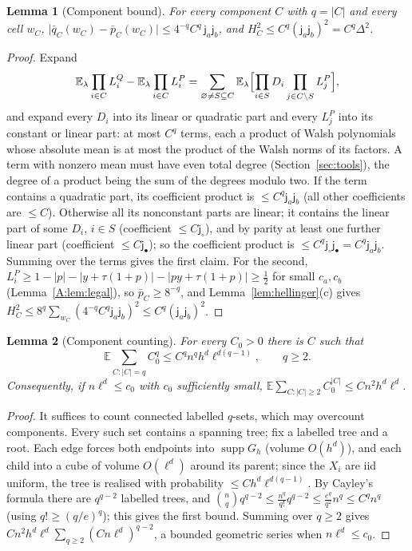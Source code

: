 \documentclass[11pt]{article}
\newtheorem{lemma}[lemma]{Lemma}
\DeclareMathOperator{\supp}{supp}
\newcommand{\E}{\mathbb{E}}
\newcommand{\abs}[1]{\lvert #1\rvert}
\newcommand{\ja}{\mathsf{j}_a}
\newcommand{\jb}{\mathsf{j}_b}
\newcommand{\jsh}{\mathsf{j}_\circ}
\newcommand{\jfi}{\mathsf{j}_\bullet}
\begin{document}
\begin{lemma}[Component bound]\label{A:lem:component}
For every component \(C\) with \(q=\abs C\) and every cell \(w_C\),
\(\abs{\bar q_C(w_C)-\bar p_C(w_C)}\le4^{-q}C^q\,\ja\jb\), and
\(H^2_C\le C^q(\ja\jb)^2=C^q\Delta^2\).
\end{lemma}
\begin{proof}
Expand
\[
 \E_\lambda\prod_{i\in C}L^Q_i-\E_\lambda\prod_{i\in C}L^P_i
 =\sum_{\varnothing\ne S\subseteq C}\E_\lambda\Bigl[\prod_{i\in S}D_i\prod_{j\in C\setminus S}L^P_j\Bigr],
\]
and expand every \(D_i\) into its linear or quadratic part and every
\(L^P_j\) into its constant or linear part: at most \(C^q\) terms, each a
product of Walsh polynomials whose absolute mean is at most the product
of the Walsh norms of its factors.  A term with nonzero mean must have
even total degree (Section~\ref{sec:tools}), the degree of a product
being the sum of the degrees modulo two.  If the term contains a
quadratic part, its coefficient product is \(\le C^q\ja\jb\) (all other
coefficients are \(\le C\)).  Otherwise all its nonconstant parts are
linear; it contains the linear part of some \(D_i\), \(i\in S\)
(coefficient \(\le C\jsh\)), and by parity at least one further linear
part (coefficient \(\le C\jfi\)); so the coefficient product is
\(\le C^q\jsh\jfi=C^q\ja\jb\).  Summing over the terms gives the first
claim.  For the second, \(L^P_i\ge1-\abs p-\abs{y+\tau(1+p)}-\abs{py+\tau(1+p)}\ge\frac12\)
for small \(c_a,c_b\) (Lemma~\ref{A:lem:legal}), so \(\bar p_C\ge8^{-q}\), and
Lemma~\ref{lem:hellinger}(c) gives
\(H^2_C\le8^q\sum_{w_C}(4^{-q}C^q\ja\jb)^2\le C^q(\ja\jb)^2\).
\end{proof}

\begin{lemma}[Component counting]\label{A:lem:counting}
For every \(C_0>0\) there is \(C\) such that
\[
 \E\sum_{C:\abs C=q}C_0^q\le C^qn^qh^d\ell^{d(q-1)},\qquad q\ge2.
\]
Consequently, if \(n\ell^d\le c_0\) with \(c_0\) sufficiently small,
\(\E\sum_{C:\abs C\ge2}C_0^{\abs C}\le Cn^2h^d\ell^d\).
\end{lemma}
\begin{proof}
It suffices to count connected labelled \(q\)-sets, which may overcount
components.  Every such set contains a spanning tree; fix a labelled tree
and a root.  Each edge forces both endpoints into \(\supp G_h\)
(volume \(O(h^d)\)), and each child into a cube of volume \(O(\ell^d)\)
around its parent; since the \(X_i\) are iid uniform, the tree is realised
with probability \(\le Ch^d\ell^{d(q-1)}\).  By Cayley's formula there are
\(q^{q-2}\) labelled trees, and
\(\binom nq q^{q-2}\le\frac{n^q}{q!}q^{q-2}\le\frac{e^q}{q^2}n^q\le C^qn^q\)
(using \(q!\ge(q/e)^q\)); this gives the first bound.  Summing over \(q\ge2\) gives
\(Cn^2h^d\ell^d\sum_{q\ge2}(Cn\ell^d)^{q-2}\), a bounded geometric series
when \(n\ell^d\le c_0\).
\end{proof}
\end{document}
